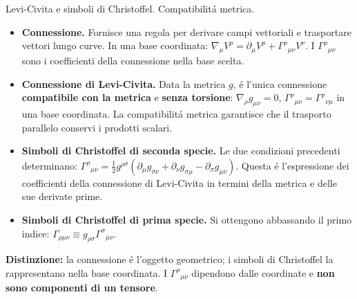 \begin{frame}[t]{Levi-Civita e simboli di Christoffel. Compatibilit\'a metrica.}
\small\raggedright
\begin{itemize}
\item \textbf{Connessione.} Fornisce una regola per derivare campi vettoriali e trasportare vettori lungo curve. In una base coordinata: $\nabla_\mu V^\rho=\partial_\mu V^\rho+\Gamma^\rho{}_{\mu\nu}V^\nu$. I $\Gamma^\rho{}_{\mu\nu}$ sono i coefficienti della connessione nella base scelta.
\item \textbf{Connessione di Levi-Civita.} Data la metrica $g$, \'e l'unica connessione \textbf{compatibile con la metrica} e \textbf{senza torsione}: $\nabla_\rho g_{\mu\nu}=0$, $\Gamma^\rho{}_{\mu\nu}=\Gamma^\rho{}_{\nu\mu}$ in una base coordinata. La compatibilit\'a metrica garantisce che il trasporto parallelo conservi i prodotti scalari.
\item \textbf{Simboli di Christoffel di seconda specie.} Le due condizioni precedenti determinano: $\Gamma^\rho{}_{\mu\nu}=\frac12g^{\rho\sigma}\left(\partial_\mu g_{\sigma\nu}+\partial_\nu g_{\sigma\mu}-\partial_\sigma g_{\mu\nu}\right)$. Questa \'e l'espressione dei coefficienti della connessione di Levi-Civita in termini della metrica e delle sue derivate prime.
\item \textbf{Simboli di Christoffel di prima specie.} Si ottengono abbassando il primo indice: $\Gamma_{\rho\mu\nu}\equiv g_{\rho\sigma}\Gamma^\sigma{}_{\mu\nu}$.
\end{itemize}
\textbf{Distinzione:} la connessione \'e l'oggetto geometrico; i simboli di Christoffel la rappresentano nella base coordinata. I $\Gamma^\rho{}_{\mu\nu}$ dipendono dalle coordinate e \textbf{non sono componenti di un tensore}.
\end{frame}

